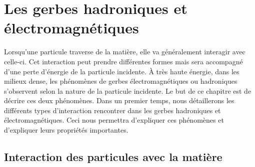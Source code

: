 \chapter{Les gerbes hadroniques et électromagnétiques}
\label{chap.shower}
Lorsqu'une particule traverse de la matière, elle va généralement interagir avec celle-ci. Cet interaction peut prendre différentes formes mais sera accompagné d'une perte d'énergie de la particule incidente. À très haute énergie, dans les milieux dense, les phénomènes de gerbes électromagnétiques ou hadroniques s'observent selon la nature de la particule incidente. Le but de ce chapitre est de décrire ces deux phénomènes. Dans un premier temps, nous détaillerons les différents types d'interaction rencontrer dans les gerbes hadroniques et électromagnétiques. Ceci nous permettra d'expliquer ces phénomènes et d'expliquer leurs propriétés importantes.
\minitoc
\newpage


\section{Interaction des particules avec la matière}
\label{sec.particle_in_matter}

